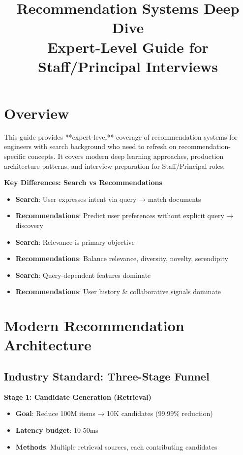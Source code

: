 \documentclass[10pt]{article}
\title{\textbf{Recommendation Systems Deep Dive} \\ \large Expert-Level Guide for Staff/Principal Interviews}
\author{}
\date{}
\begin{document}
\maketitle

\section*{Overview}

This guide provides **expert-level** coverage of recommendation systems for engineers with search background who need to refresh on recommendation-specific concepts. It covers modern deep learning approaches, production architecture patterns, and interview preparation for Staff/Principal roles.

\textbf{Key Differences: Search vs Recommendations}
\begin{itemize}
\item \textbf{Search}: User expresses intent via query → match documents
\item \textbf{Recommendations}: Predict user preferences without explicit query → discovery
\item \textbf{Search}: Relevance is primary objective
\item \textbf{Recommendations}: Balance relevance, diversity, novelty, serendipity
\item \textbf{Search}: Query-dependent features dominate
\item \textbf{Recommendations}: User history \& collaborative signals dominate
\end{itemize}

\section{Modern Recommendation Architecture}

\subsection{Industry Standard: Three-Stage Funnel}

\textbf{Stage 1: Candidate Generation (Retrieval)}
\begin{itemize}
\item \textbf{Goal}: Reduce 100M items → 10K candidates (99.99\% reduction)
\item \textbf{Latency budget}: 10-50ms
\item \textbf{Methods}: Multiple retrieval sources, each contributing candidates
\end{itemize}
\end{document}
